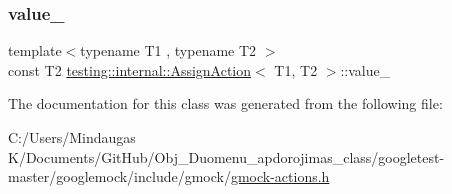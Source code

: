 \mbox{\label{classtesting_1_1internal_1_1_assign_action_a6b76b6b0b0483f2918dab3f2df960dce}} 
\subsubsection{\texorpdfstring{value\_}{value\_}}
{\footnotesize\ttfamily template$<$typename T1 , typename T2 $>$ \\
const T2 \mbox{\hyperlink{classtesting_1_1internal_1_1_assign_action}{testing\+::internal\+::\+Assign\+Action}}$<$ T1, T2 $>$\+::value\+\_\+\hspace{0.3cm}{\ttfamily [private]}}



The documentation for this class was generated from the following file\+:\begin{DoxyCompactItemize}
\item 
C\+:/\+Users/\+Mindaugas K/\+Documents/\+Git\+Hub/\+Obj\+\_\+\+Duomenu\+\_\+apdorojimas\+\_\+class/googletest-\/master/googlemock/include/gmock/\mbox{\hyperlink{googletest-master_2googlemock_2include_2gmock_2gmock-actions_8h}{gmock-\/actions.\+h}}\end{DoxyCompactItemize}
